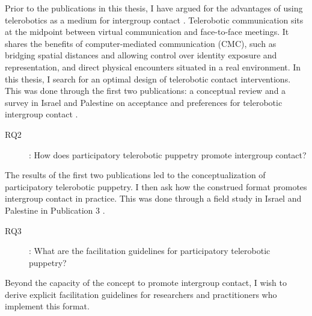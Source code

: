 \documentclass[dissertation,math,vertlayout,pdfa,colorlinks,nologo]{aaltoseries}
\begin{document}
Prior to the publications in this thesis, I have argued for the advantages of using telerobotics as a medium for intergroup contact \cite{peledPotentialTelepresenceRobots2020}. Telerobotic communication sits at the midpoint between virtual communication and face-to-face meetings. It shares the benefits of computer-mediated communication (CMC), such as bridging spatial distances and allowing control over identity exposure and representation, and direct physical encounters situated in a real environment. In this thesis, I search for an optimal design of telerobotic contact interventions. This was done through the first two publications: a conceptual review \cite{peledTelerobotContactHypothesis2022} and a survey in Israel and Palestine on acceptance and preferences for telerobotic intergroup contact \cite{peledTeleroboticIntergroupContact2024}.

\begin{description}
\item[RQ2]: How does participatory telerobotic puppetry promote intergroup contact?
\end{description}

The results of the first two publications led to the conceptualization of participatory telerobotic puppetry. I then ask how the construed format promotes intergroup contact in practice. This was done through a field study in Israel and Palestine in Publication 3 \cite{peledTeleroboticTheaterOppressed2025}.

\begin{description}
\item[RQ3]: What are the facilitation guidelines for participatory telerobotic puppetry?
\end{description}

Beyond the capacity of the concept to promote intergroup contact, I wish to derive explicit facilitation guidelines for researchers and practitioners who implement this format.



\end{document}
